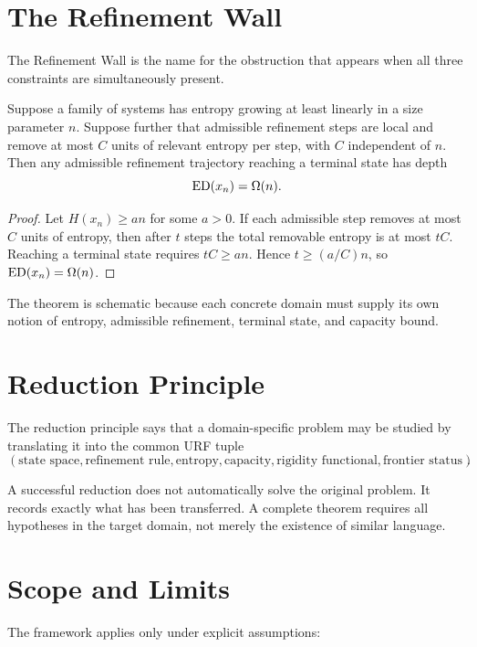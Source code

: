\section{The Refinement Wall}

The Refinement Wall is the name for the obstruction that appears when all
three constraints are simultaneously present.

\begin{theorem}
Suppose a family of systems has entropy growing at least linearly in a size
parameter \(n\). Suppose further that admissible refinement steps are local and
remove at most \(C\) units of relevant entropy per step, with \(C\) independent
of \(n\). Then any admissible refinement trajectory reaching a terminal state
has depth
\[
\mathrm{ED}(x_n)=\Omega(n).
\]
\end{theorem}

\begin{proof}
Let \(H(x_n)\ge an\) for some \(a>0\). If each admissible step removes at most
\(C\) units of entropy, then after \(t\) steps the total removable entropy is
at most \(tC\). Reaching a terminal state requires \(tC\ge an\). Hence
\(t\ge (a/C)n\), so \(\mathrm{ED}(x_n)=\Omega(n)\).
\end{proof}

The theorem is schematic because each concrete domain must supply its own
notion of entropy, admissible refinement, terminal state, and capacity bound.

\section{Reduction Principle}

The reduction principle says that a domain-specific problem may be studied by
translating it into the common URF tuple
\[
(\text{state space},\text{refinement rule},\text{entropy},
\text{capacity},\text{rigidity functional},\text{frontier status}).
\]

A successful reduction does not automatically solve the original problem.
It records exactly what has been transferred. A complete theorem requires
all hypotheses in the target domain, not merely the existence of similar
language.

\section{Scope and Limits}

The framework applies only under explicit assumptions:

